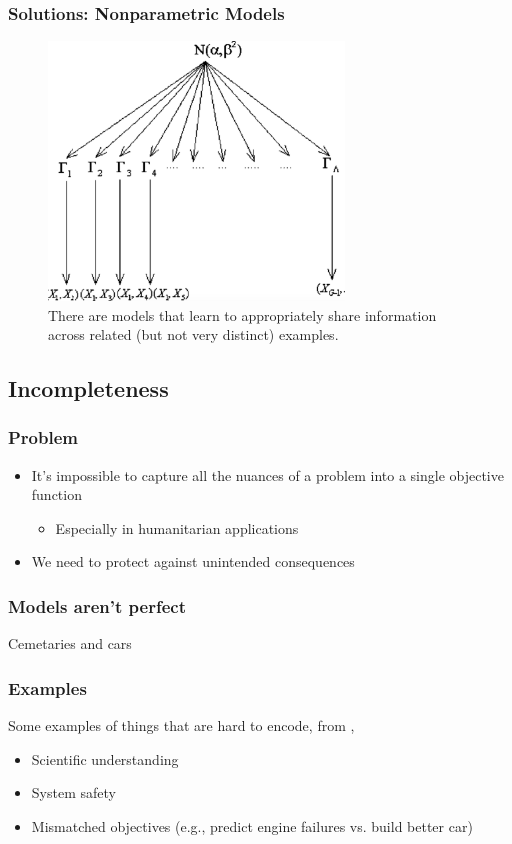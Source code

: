 \documentclass[10pt,mathserif]{beamer}
\begin{document}
\begin{frame}
  \frametitle{Solutions: Nonparametric Models}
  \begin{figure}[ht]
    \centering
    \includegraphics[width=0.7\textwidth]{figures/indian_buffet}
    \caption{There are models that learn to appropriately share information
      across related (but not very distinct) examples. \label{fig:label} }
\end{figure}
\end{frame}

\subsection{Incompleteness}
\label{subsec:label}

\begin{frame}
  \frametitle{Problem}
  \begin{itemize}
  \item It's impossible to capture all the nuances of a problem into a single
    objective function
    \begin{itemize}
    \item Especially in humanitarian applications
    \end{itemize}
  \item We need to protect against unintended consequences
  \end{itemize}
\end{frame}

\begin{frame}
  \frametitle{Models aren't perfect}
 Cemetaries and cars 
\end{frame}

\begin{frame}
  \frametitle{Examples}
  Some examples of things that are hard to encode, from
  \citep{doshi2017towards},
  \begin{itemize}
  \item Scientific understanding
  \item System safety
  \item Mismatched objectives (e.g., predict engine failures vs. build better
    car)
  \end{itemize}
\end{frame}
\end{document}
